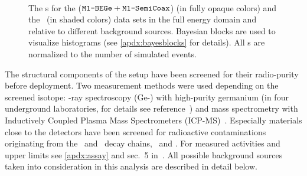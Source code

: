 \begin{figure}
  \centering
  \hfill

  \hfill
   \\

  \hfill

  \caption{%
    The \pdf{}s for the  ($\texttt{M1-BEGe} + \texttt{M1-SemiCoax}$) (in fully opaque colors) and
    the \enrGeII\ (in shaded colors) data sets in the full energy domain and relative to
    different background sources. Bayesian blocks are used to visualize histograms (see
    \cref{apdx:bayesblocks} for details). All \pdf{}s are normalized to the number of
    simulated events.
  }\label{fig:bkg:raw:ph2:pdfs:gmodel}
\end{figure}

The structural components of the setup have been screened for their radio-purity before
deployment. Two measurement methods were used depending on the screened isotope: \g-ray
spectroscopy (Ge-\g) with high-purity germanium (in four underground laboratories, for
details see reference~\cite{Ackermann2012}) and mass spectrometry with Inductively Coupled
Plasma Mass Spectrometers (ICP-MS)~\cite{Vacri2015}. Especially materials close to the
detectors have been screened for radioactive contaminations originating from the \Uh\ and
\Thh\ decay chains, \kvn\ and \Co. For measured activities and upper limits see
\cref{apdx:assay} and sec.~5 in~\cite{Agostini2018a}. All possible background sources
taken into consideration in this analysis are described in detail below.

